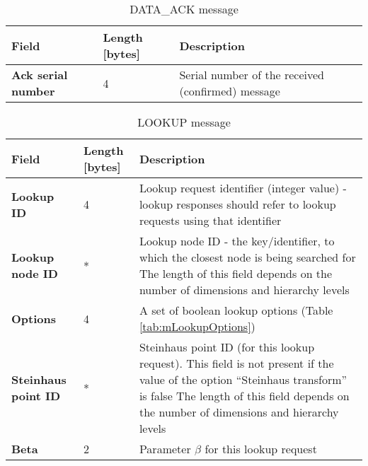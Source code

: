 

\begin{table}[H]
\scriptsize
\begin{center}
\begin{tabular}{p{3cm} p{2cm} p{9.5cm}}
	\hline
	\textbf{Field}						& \textbf{Length} [bytes]				& \textbf{Description}				\\[1mm]
    \hline
    \textbf{Ack serial number}					& 4										& Serial number of the received (confirmed) message					\\[1.5mm]
    \hline
\end{tabular}
\end{center}
\caption{DATA\_ACK message}
\label{tab:mDataAck}
\end{table}




\begin{table}[H]
\scriptsize
\begin{center}
\begin{tabular}{p{3cm} p{2cm} p{9.5cm}}
	\hline
	\textbf{Field}						& \textbf{Length} [bytes]				& \textbf{Description}				\\[1mm]
    \hline
    \textbf{Lookup ID}					& 4										& Lookup request identifier (integer value) - lookup responses should refer to lookup requests using that identifier					\\[1.5mm]
	\textbf{Lookup node ID}				& *										& Lookup node ID - the key/identifier, to which the closest node is being searched for \newline * The length of this field depends on the number of dimensions and hierarchy levels					\\[1.5mm]
	\textbf{Options}					& 4										& A set of boolean lookup options (Table \ref{tab:mLookupOptions})				\\[1.5mm]
	\textbf{Steinhaus point ID} \newline [optional]		& *						& Steinhaus point ID (for this lookup request). This field is not present if the value of the option ``Steinhaus transform'' is false \newline * The length of this field depends on the number of dimensions and hierarchy levels					\\[1.5mm]	
	\textbf{Beta}						& 2										& Parameter $\beta$ for this lookup request				\\[1.5mm]
    \hline
\end{tabular}
\end{center}
\caption{LOOKUP message}
\label{tab:mLookup}
\end{table}

